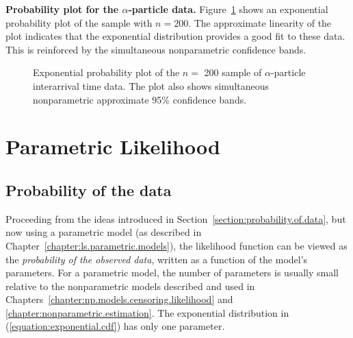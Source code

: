 \begin{example}
{\bf Probability plot for the $\alpha$-particle data.}
Figure~\ref{figure:alpha.nppp.exp.ps} shows an exponential
probability plot of the sample with $n=200$.  The approximate
linearity of the plot indicates that the exponential distribution
provides a good fit to these data. This is reinforced by the
simultaneous nonparametric confidence bands.
\begin{figure}
\caption{Exponential probability plot of
the $n = $ 200 sample of $\alpha$-particle interarrival time
data. The plot also shows 
simultaneous nonparametric approximate 95\% confidence bands.}
\label{figure:alpha.nppp.exp.ps}
\end{figure}
\end{example}

\section{Parametric Likelihood}
\label{section:param.like}
\subsection{Probability of the data}

Proceeding from the ideas introduced in
Section~\ref{section:probability.of.data}, but now using a parametric
model (as described in
Chapter~\ref{chapter:ls.parametric.models}), the likelihood function can be
viewed as the {\em probability of the observed data}, written as a
function of the model's parameters.  For a parametric model, the
number of parameters is usually small relative to the
nonparametric models described and used in
Chapters~\ref{chapter:np.models.censoring.likelihood} and
\ref{chapter:nonparametric.estimation}. The exponential distribution
in (\ref{equation:exponential.cdf}) has only one parameter.


